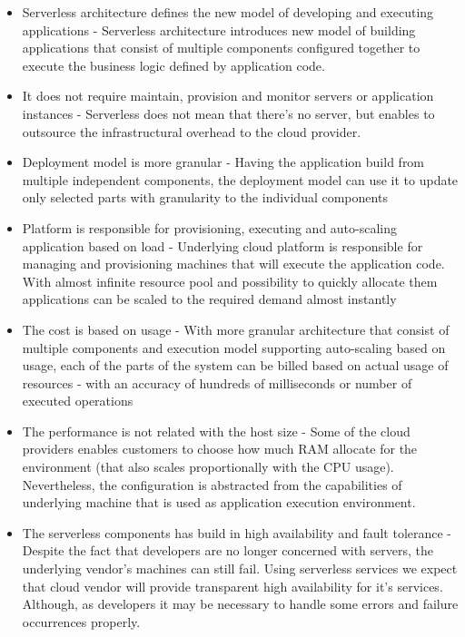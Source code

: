 \begin{itemize}
    \item Serverless architecture defines the new model of developing and executing applications - Serverless architecture introduces new model of building applications that consist of multiple components configured together to execute the business logic defined by application code.
    \item It does not require maintain, provision and monitor servers or application instances - Serverless does not mean that there's no server, but enables to outsource the infrastructural overhead to the cloud provider.
    \item Deployment model is more granular - Having the application build from multiple independent components, the deployment model can use it to update only selected parts with granularity to the individual components
    \item Platform is responsible for provisioning, executing and auto-scaling application based on load - Underlying cloud platform is responsible for managing and provisioning machines that will execute the application code. With almost infinite resource pool and possibility to quickly allocate them applications can be scaled to the required demand almost instantly    
    \item The cost is based on usage - With more granular architecture that consist of multiple components and execution model supporting auto-scaling based on usage, each of the parts of the system can be billed based on actual usage of resources - with an accuracy of hundreds of milliseconds or number of executed operations
    \item The performance is not related with the host size - Some of the cloud providers enables customers to choose how much RAM allocate for the environment (that also scales proportionally with the CPU usage). Nevertheless, the configuration is abstracted from the capabilities of underlying machine that is used as application execution environment.
    \item The serverless components has build in high availability and fault tolerance - Despite the fact that developers are no longer concerned with servers, the underlying vendor's machines can still fail. Using serverless services we expect that cloud vendor will provide transparent high availability for it's services. Although, as developers it may be necessary to handle some errors and failure occurrences properly.
\end{itemize}

